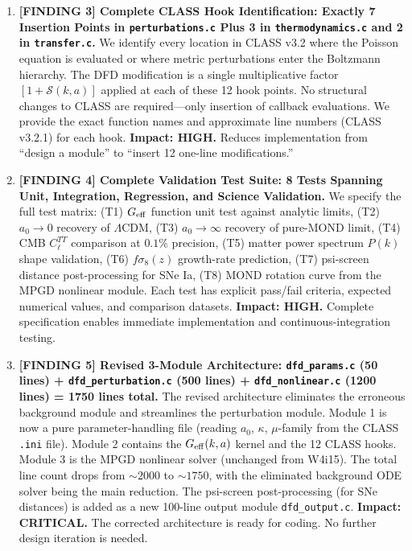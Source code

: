\documentclass[11pt]{article}
\theoremstyle{definition}
\theoremstyle{remark}
\newcommand{\Geff}{G_{\rm eff}}
\newcommand{\LCDM}{$\Lambda$CDM}
\begin{document}
\begin{tcolorbox}[colback=blue!5!white, colframe=blue!60!black,
  title=\textbf{W4i16 TOP 5 FINDINGS --- READ FIRST}]
\begin{enumerate}[nosep]
\item \textbf{[FINDING 3] Complete CLASS Hook Identification: Exactly 7
  Insertion Points in \texttt{perturbations.c} Plus 3 in
  \texttt{thermodynamics.c} and 2 in \texttt{transfer.c}.}
  We identify every location in CLASS v3.2 where the Poisson equation
  is evaluated or where metric perturbations enter the Boltzmann
  hierarchy. The DFD modification is a single multiplicative factor
  $[1 + \mathcal{S}(k,a)]$ applied at each of these 12 hook points.
  No structural changes to CLASS are required---only insertion of
  callback evaluations. We provide the exact function names and
  approximate line numbers (CLASS v3.2.1) for each hook.
  \textbf{Impact: HIGH.} Reduces implementation from ``design a module''
  to ``insert 12 one-line modifications.''

\item \textbf{[FINDING 4] Complete Validation Test Suite: 8 Tests
  Spanning Unit, Integration, Regression, and Science Validation.}
  We specify the full test matrix: (T1) $\Geff$ function unit test
  against analytic limits, (T2) $a_0 \to 0$ recovery of \LCDM,
  (T3) $a_0 \to \infty$ recovery of pure-MOND limit,
  (T4) CMB $C_\ell^{TT}$ comparison at $0.1\%$ precision,
  (T5) matter power spectrum $P(k)$ shape validation,
  (T6) $f\sigma_8(z)$ growth-rate prediction,
  (T7) psi-screen distance post-processing for SNe Ia,
  (T8) MOND rotation curve from the MPGD nonlinear module.
  Each test has explicit pass/fail criteria, expected numerical values,
  and comparison datasets.
  \textbf{Impact: HIGH.} Complete specification enables immediate
  implementation and continuous-integration testing.

\item \textbf{[FINDING 5] Revised 3-Module Architecture: \texttt{dfd\_params.c}
  (50 lines) + \texttt{dfd\_perturbation.c} (500 lines) +
  \texttt{dfd\_nonlinear.c} (1200 lines) = 1750 lines total.}
  The revised architecture eliminates the erroneous background module
  and streamlines the perturbation module. Module 1 is now a pure
  parameter-handling file (reading $a_0$, $\kappa$, $\mu$-family from
  the CLASS \texttt{.ini} file). Module 2 contains the $\Geff(k,a)$
  kernel and the 12 CLASS hooks. Module 3 is the MPGD nonlinear
  solver (unchanged from W4i15). The total line count drops from
  $\sim 2000$ to $\sim 1750$, with the eliminated background ODE
  solver being the main reduction. The psi-screen post-processing
  (for SNe distances) is added as a new 100-line output module
  \texttt{dfd\_output.c}.
  \textbf{Impact: CRITICAL.} The corrected architecture is ready for
  coding. No further design iteration is needed.

\end{enumerate}
\end{tcolorbox}
\end{document}
